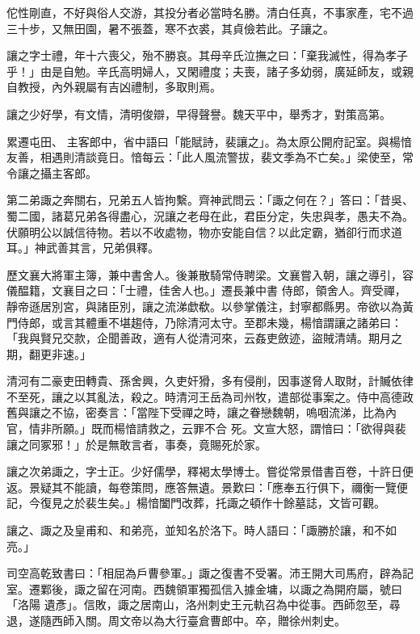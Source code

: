\begin{pinyinscope}
 佗性剛直，不好與俗人交游，其投分者必當時名勝。清白任真，不事家產，宅不過三十步，又無田園，暑不張蓋，寒不衣裘，其貞儉若此。子讓之。



 讓之字士禮，年十六喪父，殆不勝哀。其母辛氏泣撫之曰：「棄我滅性，得為孝子乎！」由是自勉。辛氏高明婦人，又閑禮度；夫喪，諸子多幼弱，廣延師友，或親自教授，內外親屬有吉凶禮制，多取則焉。



 讓之少好學，有文情，清明俊辯，早得聲譽。魏天平中，舉秀才，對策高第。



 累遷屯田、
 主客郎中，省中語曰「能賦詩，裴讓之」。為太原公開府記室。與楊愔友善，相遇則清談竟日。愔每云：「此人風流警拔，裴文季為不亡矣。」梁使至，常令讓之攝主客郎。



 第二弟諏之奔關右，兄弟五人皆拘繫。齊神武問云：「諏之何在？」答曰：「昔吳、蜀二國，諸葛兄弟各得盡心，況讓之老母在此，君臣分定，失忠與孝，愚夫不為。伏願明公以誠信待物。若以不收處物，物亦安能自信？以此定霸，猶卻行而求道耳。」神武善其言，兄弟俱釋。



 歷文襄大將軍主簿，兼中書舍人。後兼散騎常侍聘梁。文襄嘗入朝，讓之導引，容儀醖籍，文襄目之曰：「士禮，佳舍人也。」遷長兼中書
 侍郎，領舍人。齊受禪，靜帝遜居別宮，與諸臣別，讓之流涕歔欷。以參掌儀注，封寧都縣男。帝欲以為黃門侍郎，或言其體重不堪趨侍，乃除清河太守。至郡未幾，楊愔謂讓之諸弟曰：「我與賢兄交款，企聞善政，適有人從清河來，云姦吏斂迹，盜賊清靖。期月之期，翻更非速。」



 清河有二豪吏田轉貴、孫舍興，久吏奸猾，多有侵削，因事遂脅人取財，計贓依律不至死，讓之以其亂法，殺之。時清河王岳為司州牧，遣部從事案之。侍中高德政舊與讓之不協，密奏言：「當陛下受禪之時，讓之眷戀魏朝，嗚咽流涕，比為內官，情非所願。」既而楊愔請救之，云罪不合
 死。文宣大怒，謂愔曰：「欲得與裴讓之同冢邪！」於是無敢言者，事奏，竟賜死於家。



 讓之次弟諏之，字士正。少好儒學，釋褐太學博士。嘗從常景借書百卷，十許日便返。景疑其不能讀，每卷策問，應答無遺。景歎曰：「應奉五行俱下，禰衡一覽便記，今復見之於裴生矣。」楊愔闔門改葬，托諏之頓作十餘墓誌，文皆可觀。



 讓之、諏之及皇甫和、和弟亮，並知名於洛下。時人語曰：「諏勝於讓，和不如亮。」



 司空高乾致書曰：「相屈為戶曹參軍。」諏之復書不受署。沛王開大司馬府，辟為記室。遷鄴後，諏之留在河南。西魏領軍獨孤信入據金墉，以諏之為開府屬，號曰「洛陽
 遺彥」。信敗，諏之居南山，洛州刺史王元軌召為中從事。西師忽至，尋退，遂隨西師入關。周文帝以為大行臺倉曹郎中。卒，贈徐州刺史。




\end{pinyinscope}
